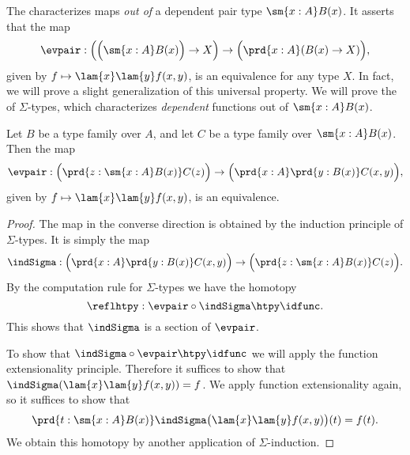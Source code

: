 The  characterizes maps \emph{out of} a dependent pair type $\sm{x:A}B(x)$. It asserts that the map
\begin{equation*}
\evpair:\Big(\Big(\sm{x:A}B(x)\Big)\to X\Big)\to \Big(\prd{x:A}(B(x)\to X)\Big),
\end{equation*}
given by $f\mapsto\lam{x}\lam{y}f(x,y)$, is an equivalence for any type $X$. In fact, we will prove a slight generalization of this universal property. We will prove the  of $\Sigma$-types, which characterizes \emph{dependent} functions out of $\sm{x:A}B(x)$.

\begin{thm}\label{thm:up-sigma}
Let $B$ be a type family over $A$, and let $C$ be a type family over $\sm{x:A}B(x)$. Then the map
\begin{equation*}
\evpair:\Big(\prd{z:\sm{x:A}B(x)}C(z)\Big)\to \Big(\prd{x:A}\prd{y:B(x)}C(x,y)\Big),
\end{equation*}
given by $f\mapsto\lam{x}\lam{y}f(x,y)$, is an equivalence.
\end{thm}

\begin{proof}
The map in the converse direction is obtained by the induction principle of $\Sigma$-types. It is simply the map
\begin{equation*}
\indSigma : \Big(\prd{x:A}\prd{y:B(x)}C(x,y)\Big)\to \Big(\prd{z:\sm{x:A}B(x)}C(z)\Big).
\end{equation*}
By the computation rule for $\Sigma$-types we have the homotopy
\begin{equation*}
\reflhtpy:\evpair\circ\indSigma\htpy\idfunc.
\end{equation*}
This shows that $\indSigma$ is a section of $\evpair$.

To show that $\indSigma\circ\evpair\htpy\idfunc$ we will apply the function extensionality principle. Therefore it suffices to show that $\indSigma(\lam{x}\lam{y}f(x,y))=f$. We apply function extensionality again, so it suffices to show that
\begin{equation*}
\prd{t:\sm{x:A}B(x)}\indSigma\big(\lam{x}\lam{y}f(x,y)\big)(t)=f(t).
\end{equation*}
We obtain this homotopy by another application of $\Sigma$-induction. 
\end{proof}

